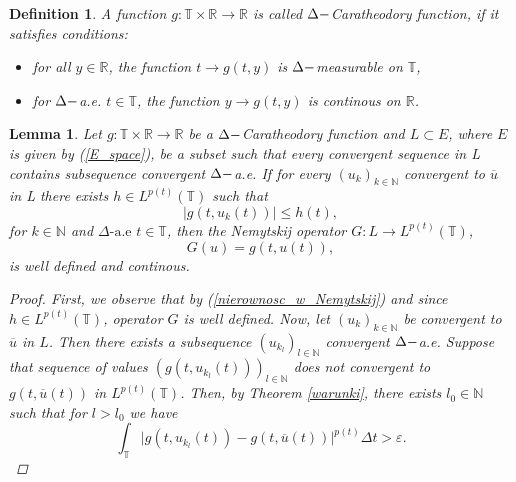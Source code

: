 \documentclass[12pt,a4paper,oneside,titlepage]{article}
\newtheorem{Def}{Definition}
\newtheorem{Lemat}{Lemma}
\renewcommand{\epsilon}{\varepsilon}
\begin{document}
\begin{Def} A function $g : \mathbb{T} \times \mathbb{R} \rightarrow \mathbb{R}$ is called $\Delta \-- $Caratheodory function, if it satisfies conditions:
\begin{itemize}
\item[(C1)] for all $y \in \mathbb{R}$, the function $t \rightarrow g(t,y)$ is $\Delta \-- $measurable on $\mathbb{T}$,
\item[(C2)] for $\Delta \-- $a.e. $t \in \mathbb{T}$, the function $y \rightarrow g(t,y)  $ is continous on $\mathbb{R}$. 
\end{itemize}
\end{Def}



\begin{Lemat}
\label{Nemytskij_1} Let $g:\mathbb{T} \times \mathbb{R}\rightarrow \mathbb{R}$ be a $\Delta \-- $Caratheodory function and $L \subset E$, where $E$ is given by (\ref{E_space}), be a subset such that every convergent sequence in L contains subsequence convergent $\Delta \-- $a.e. If for every $\left( u_k \right)_{k \in \mathbb{N}}$ convergent to $\overline{u}$ in L there exists $h \in L^{p(t)}\left( \mathbb{T}\right)$ such that 
\begin{equation}
\label{nierownosc_w_Nemytskij}
\vert g(t, u_k(t)) \vert \leq h(t),
\end{equation}
for $k \in \mathbb{N} $ and $\Delta \text{-a.e } t \in \mathbb{T} $,
then the Nemytskij operator  $G:L \rightarrow L^{p(t)}\left( \mathbb{T} \right)$, 
\begin{equation}
\label{Niemycki_def}
G(u)=g(t,u(t)),
\end{equation}
 is well defined and continous.
 \begin{proof}
 First, we observe that by (\ref{nierownosc_w_Nemytskij}) and since  $h \in L^{p(t)}\left( \mathbb{T}\right)$,  operator $G$ is well defined. Now, let $\left( u_k \right)_{k \in \mathbb{N}}$ be convergent to $\overline{u}$ in $L$. Then there exists a subsequence $\left( u_{k_l} \right)_{l \in \mathbb{N}}$ convergent $\Delta \-- $a.e. Suppose that sequence of values $\left( g \left( t,u_{k_l}(t)\right) \right)_{l \in \mathbb{N}}$ does not convergent to $g (t,\overline{u}(t))$ in $L^{p(t)}(\mathbb{T})$. Then, by Theorem \ref{warunki}, there exists $l_0 \in \mathbb{N}$ such that for $l>l_0$ we have
 \begin{equation}
\label{calka_Nem}
 \int_{\mathbb{T}} \vert g(t,u_{k_l}(t)) - g(t,\overline{u}(t)) \vert^{p(t)} \Delta t > \epsilon.
 \end{equation}

\end{proof}
\end{Lemat}
\end{document}
